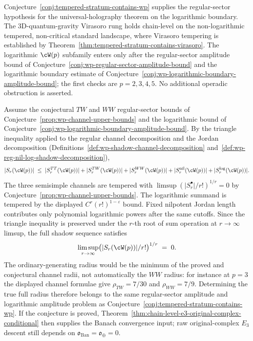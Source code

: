 \begin{remark}%
\label{rem:anchor-wp-regular-sector}%
%
Conjecture~\ref{conj:tempered-stratum-contains-wp} supplies the
regular-sector hypothesis for the universal-holography theorem on the
logarithmic boundary. The
3D-quantum-gravity Virasoro rung holds chain-level on the
non-logarithmic tempered, non-critical standard landscape, where
Virasoro tempering is established by
Theorem~\ref{thm:tempered-stratum-contains-virasoro}. The logarithmic
$\cW(p)$ subfamily enters only after the regular-sector amplitude bound
of Conjecture~\ref{conj:wp-regular-sector-amplitude-bound} and the
logarithmic boundary estimate of
Conjecture~\ref{conj:wp-logarithmic-boundary-amplitude-bound}; the
first checks are $p=2,3,4,5$. No additional operadic obstruction is
asserted.
\end{remark}

\begin{remark}
Assume the conjectural $TW$ and $WW$ regular-sector bounds of
Conjecture~\ref{prop:wp-channel-upper-bounds} and the logarithmic
bound of
Conjecture~\ref{conj:wp-logarithmic-boundary-amplitude-bound}. By the
triangle inequality applied to the regular channel decomposition and
the Jordan decomposition
(Definitions~\ref{def:wp-shadow-channel-decomposition}
and~\ref{def:wp-reg-nil-log-shadow-decomposition}),
\[
 \lvert S_r(\cW(p)) \rvert \;\le\;
 \lvert S_r^{TT}(\cW(p)) \rvert +
 \lvert S_r^{TW}(\cW(p)) \rvert +
 \lvert S_r^{WW}(\cW(p)) \rvert+
 \lvert S_r^{\mathrm{nil}}(\cW(p)) \rvert+
 \lvert S_r^{\log}(\cW(p)) \rvert.
\]
The three semisimple channels are tempered with
$\limsup (\lvert S_r^\bullet \rvert / r!)^{1/r} = 0$ by
Conjecture~\ref{prop:wp-channel-upper-bounds}. The logarithmic summand
is tempered by the displayed $C^r(r!)^{1-\varepsilon}$ bound. Fixed
nilpotent Jordan length contributes only polynomial logarithmic powers
after the same cutoffs. Since the triangle inequality is preserved
under the $r$-th root of sum operation at $r \to \infty$ limsup,
the full shadow sequence satisfies
\[
 \limsup_{r \to \infty}
 \bigl( \lvert S_r(\cW(p)) \rvert / r! \bigr)^{1/r} \;=\; 0.
\]
The ordinary-generating radius would be the minimum of the proved
and conjectural channel radii, not automatically the $WW$ radius:
for instance at $p=3$ the displayed channel formulae give
$\rho_{TW}=7/30$ and $\rho_{WW}=7/9$. Determining the true full
radius therefore belongs to the same regular-sector amplitude
and logarithmic amplitude problem as
Conjecture~\ref{conj:tempered-stratum-contains-wp}.
If the conjecture is proved, Theorem~\ref{thm:chain-level-e3-original-complex-conditional}
then supplies the Banach convergence input; raw original-complex
$E_3$ descent still depends on
$\mathfrak{o}_{\mathrm{Ban}}=\mathfrak{o}_{\oplus}=0$.
\end{remark}


